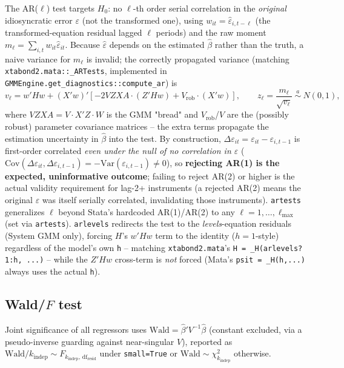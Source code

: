 \documentclass[11pt,a4paper]{article}
\begin{document}
The AR($\ell$) test targets $H_0$: no $\ell$-th order serial correlation in
the \emph{original} idiosyncratic error $\varepsilon$ (not the transformed
one), using $w_{it}=\hat\varepsilon_{i,t-\ell}$ (the transformed-equation
residual lagged $\ell$ periods) and the raw moment
$m_\ell=\sum_{i,t}w_{it}\hat\varepsilon_{it}$. Because $\hat\varepsilon$
depends on the estimated $\hat\beta$ rather than the truth, a naive variance
for $m_\ell$ is invalid; the correctly propagated variance (matching
\texttt{xtabond2.mata::\_ARTests}, implemented in
\texttt{GMMEngine.get\_diagnostics::compute\_ar}) is
\[
  v_\ell = w'Hw + (X'w)'\left[-2VZXA\cdot(Z'Hw) + V_{\mathrm{rob}}\cdot(X'w)\right],
  \qquad z_\ell = \frac{m_\ell}{\sqrt{v_\ell}}\ \overset{a}{\sim}\ N(0,1),
\]
where $VZXA=V\cdot X'Z\cdot W$ is the GMM "bread" and $V_{\mathrm{rob}}$/$V$
are the (possibly robust) parameter covariance matrices -- the extra terms
propagate the estimation uncertainty in $\hat\beta$ into the test. By
construction, $\Delta\varepsilon_{it}=\varepsilon_{it}-\varepsilon_{i,t-1}$
is first-order correlated \emph{even under the null of no correlation in
$\varepsilon$} ($\mathrm{Cov}(\Delta\varepsilon_{it},\Delta\varepsilon_{i,t-1})=-\mathrm{Var}(\varepsilon_{i,t-1})\ne0$),
so \textbf{rejecting AR(1) is the expected, uninformative outcome}; failing
to reject AR(2) or higher is the actual validity requirement for lag-2+
instruments (a rejected AR(2) means the original $\varepsilon$ was itself
serially correlated, invalidating those instruments). \texttt{artests}
generalizes $\ell$ beyond Stata's hardcoded AR(1)/AR(2) to any
$\ell=1,\dots,\ell_{\max}$ (set via \texttt{artests}). \texttt{arlevels} redirects the test to the
\emph{levels}-equation residuals (System GMM only), forcing $H$'s $w'Hw$ term
to the identity ($h=1$-style) regardless of the model's own \texttt{h} --
matching \texttt{xtabond2.mata}'s
\texttt{H = \_H(arlevels?1:h, ...)} -- while the $Z'Hw$ cross-term is
\emph{not} forced (Mata's \texttt{psit = \_H(h,...)} always uses the actual
\texttt{h}).

\subsection{\texorpdfstring{Wald/$F$ test}{Wald/F test}}

Joint significance of all regressors uses
$\mathrm{Wald}=\hat\beta'V^{-1}\hat\beta$ (constant excluded, via a
pseudo-inverse guarding against near-singular $V$), reported as
$\mathrm{Wald}/k_{\mathrm{indep}}\sim F_{k_{\mathrm{indep}},\,\mathrm{df}_{\mathrm{resid}}}$
under \texttt{small=True} or $\mathrm{Wald}\sim\chi^2_{k_{\mathrm{indep}}}$
otherwise.
\end{document}
